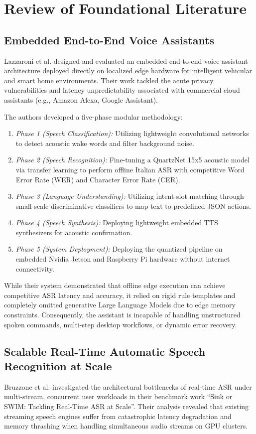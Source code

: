 \documentclass[12pt,a4paper]{report}
\begin{document}
\section{Review of Foundational Literature}

\subsection{Embedded End-to-End Voice Assistants}
Lazzaroni et al. \cite{lazzaroni2024embedded} designed and evaluated an embedded end-to-end voice assistant architecture deployed directly on localized edge hardware for intelligent vehicular and smart home environments. Their work tackled the acute privacy vulnerabilities and latency unpredictability associated with commercial cloud assistants (e.g., Amazon Alexa, Google Assistant). 

The authors developed a five-phase modular methodology:
\begin{enumerate}
    \item \textit{Phase 1 (Speech Classification):} Utilizing lightweight convolutional networks to detect acoustic wake words and filter background noise.
    \item \textit{Phase 2 (Speech Recognition):} Fine-tuning a QuartzNet 15x5 acoustic model via transfer learning to perform offline Italian ASR with competitive Word Error Rate (WER) and Character Error Rate (CER).
    \item \textit{Phase 3 (Language Understanding):} Utilizing intent-slot matching through small-scale discriminative classifiers to map text to predefined JSON actions.
    \item \textit{Phase 4 (Speech Synthesis):} Deploying lightweight embedded TTS synthesizers for acoustic confirmation.
    \item \textit{Phase 5 (System Deployment):} Deploying the quantized pipeline on embedded Nvidia Jetson and Raspberry Pi hardware without internet connectivity.
\end{enumerate}
While their system demonstrated that offline edge execution can achieve competitive ASR latency and accuracy, it relied on rigid rule templates and completely omitted generative Large Language Models due to edge memory constraints. Consequently, the assistant is incapable of handling unstructured spoken commands, multi-step desktop workflows, or dynamic error recovery.

\subsection{Scalable Real-Time Automatic Speech Recognition at Scale}
Bruzzone et al. \cite{bruzzone2026sink} investigated the architectural bottlenecks of real-time ASR under multi-stream, concurrent user workloads in their benchmark work ``Sink or SWIM: Tackling Real-Time ASR at Scale''. Their analysis revealed that existing streaming speech engines suffer from catastrophic latency degradation and memory thrashing when handling simultaneous audio streams on GPU clusters.
\end{document}
